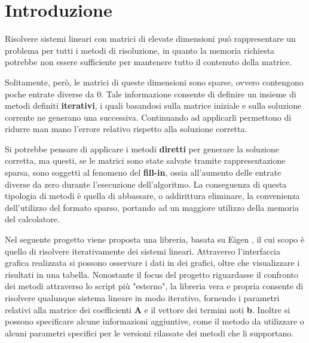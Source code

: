 \section{Introduzione}

Risolvere sistemi lineari con matrici di elevate dimensioni può rappresentare un problema per tutti i metodi di risoluzione, in quanto la memoria richiesta potrebbe non essere sufficiente per mantenere tutto il contenuto della matrice.

 Solitamente, però, le matrici di queste dimensioni sono sparse, ovvero contengono poche entrate diverse da 0. Tale informazione consente di definire un insieme di metodi definiti \textbf{iterativi}, i quali basandosi sulla matrice iniziale e sulla soluzione corrente ne generano una successiva. Continuando ad applicarli permettono di ridurre man mano l'errore relativo rispetto alla soluzione corretta.

 Si potrebbe pensare di applicare i metodi \textbf{diretti} per generare la soluzione corretta, ma questi, se le matrici sono state salvate tramite rappresentazione sparsa, sono soggetti al fenomeno del \textbf{fill-in}, ossia all'aumento delle entrate diverse da zero durante l'esecuzione dell'algoritmo. La conseguenza di questa tipologia di metodi è quella di abbassare, o addirittura eliminare, la convenienza dell'utilizzo del formato sparso, portando ad un maggiore utilizzo della memoria del calcolatore.
 
 Nel seguente progetto viene proposta una libreria, basata su Eigen \cite{Eigen} , il cui scopo è quello di risolvere iterativamente dei sistemi lineari. Attraverso l'interfaccia grafica realizzata si possono osservare i dati in dei grafici, oltre che visualizzare i risultati in una tabella. Nonostante il focus del progetto riguardasse il confronto dei metodi attraverso lo script più "esterno", la libreria vera e propria consente di risolvere qualunque sistema lineare in modo iterativo, fornendo i parametri relativi alla matrice dei coefficienti \textbf{A} e il vettore dei termini noti \textbf{b}. Inoltre si possono specificare alcune informazioni aggiuntive, come il metodo da utilizzare o alcuni parametri specifici per le versioni rilassate dei metodi che li supportano.
 
 
 